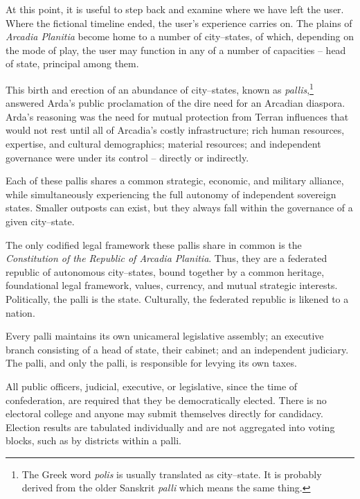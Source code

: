 

At this point, it is useful to step back and examine where we have left the user. Where the fictional timeline ended, the user's experience carries on. The plains of {\it Arcadia Planitia} become home to a number of city--states, of which, depending on the mode of play, the user may function in any of a number of capacities -- head of state, principal among them.

This birth and erection of an abundance of city--states, known as {\it pallis},\footnote{The Greek word {\it polis} is usually translated as city--state. It is probably derived from the older Sanskrit {\it palli} which means the same thing.} answered Arda's public proclamation of the dire need for an Arcadian diaspora. Arda's reasoning was the need for mutual protection from Terran influences that would not rest until all of Arcadia's costly infrastructure; rich human resources, expertise, and cultural demographics; material resources; and independent governance were under its control -- directly or indirectly.

Each of these pallis shares a common strategic, economic, and military alliance, while simultaneously experiencing the full autonomy of independent sovereign states. Smaller outposts can exist, but they always fall within the governance of a given city--state.

The only codified legal framework these pallis share in common is the {\it Constitution of the Republic of Arcadia Planitia}. Thus, they are a federated republic of autonomous city--states, bound together by a common heritage, foundational legal framework, values, currency, and mutual strategic interests. Politically, the palli is the state. Culturally, the federated republic is likened to a nation.

Every palli maintains its own unicameral legislative assembly; an executive branch consisting of a head of state, their cabinet; and an independent judiciary. The palli, and only the palli, is responsible for levying its own taxes.

All public officers, judicial, executive, or legislative, since the time of confederation, are required that they be democratically elected. There is no electoral college and anyone may submit themselves directly for candidacy. Election results are tabulated individually and are not aggregated into voting blocks, such as by districts within a palli.

